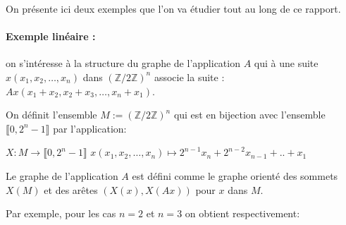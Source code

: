 On pr\'esente ici deux exemples que l'on va \'etudier tout au long de ce rapport.

\paragraph{Exemple lin\'eaire :} on s’int\'eresse \`a la structure du graphe de l’application $A$ qui \`a une suite $x(x_1, x_2, \dots, x_n)$  dans  $(\mathbb{Z}/2\mathbb{Z})^n$ associe la suite :  $Ax(x_1 + x_2, x_2 + x_3, \dots, x_n + x_1)$. 

On d\'efinit l’ensemble $M := (\mathbb{Z}/2\mathbb{Z})^n$ qui est en bijection avec l’ensemble $\llbracket 0, 2^n-1\rrbracket$ par l’application: \\
\begin{center}
$X : M \rightarrow \llbracket 0, 2^n-1\rrbracket$ \newline
$x(x_1, x_2, \dots, x_n) \mapsto 2^{n-1}x_n + 2^{n-2}x_{n-1} + .. + x_1$
\end{center}
 
Le graphe de l’application $A$ est d\'efini comme le graphe orient\'e des sommets $X(M)$ et des ar\^etes $(X(x), X(Ax))$ pour $x$ dans $M$. \newline

Par exemple, pour les cas $n=2$ et $n=3$ on obtient respectivement: \newline

